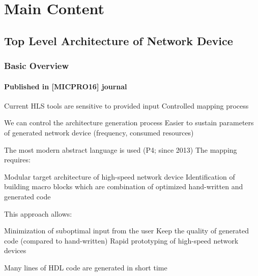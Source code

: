 \section{Main Content}
\subsection*{Top Level Architecture of Network Device}
\begin{frame}
    \frametitle{Basic Overview}
    \framesubtitle{Published in [MICPRO16] journal}
    \begin{itemize}
        \fitem Current HLS tools are sensitive to provided input
        \fitem Controlled mapping process
        \begin{itemize}
            \fitem We can control the architecture generation process
            \fitem Easier to sustain parameters of generated network device (frequency, consumed resources)
        \end{itemize}
       
        \fitem The most modern abstract language is used (P4; since 2013)
        \fitem The mapping requires:
        \begin{enumerate}
            \fitem Modular target architecture of high-speed network device
            \fitem Identification of building macro blocks which are combination of optimized hand-written and generated code
        \end{enumerate}
        
        \fitem This approach allows:
        \begin{enumerate}
            \fitem Minimization of suboptimal input from the user
            \fitem Keep the quality of generated code (compared to hand-written)
            \fitem Rapid prototyping of high-speed network devices
            \begin{itemize}
                \fitem Many lines of HDL code are generated in short time
            \end{itemize}
        \end{enumerate}
    \end{itemize}
\end{frame}

